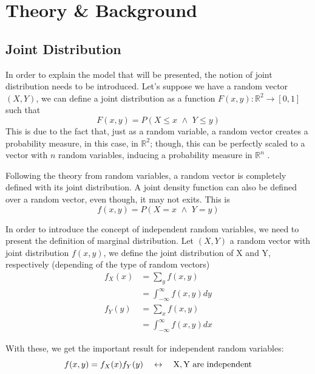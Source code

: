 \section{Theory \& Background}
\label{sec:theory}
	\subsection{Joint Distribution}\label{subsec:joint}
		In order to explain the model that will be presented, the notion of joint distribution needs to be introduced. Let's suppose we have a random vector $(X,Y)$, we can define a joint distribution as a function $F(x,y):\mathbb{R}^2\rightarrow[0,1]$ such that
        \begin{equation}
        	F(x,y)=P(X\leq x\,\,\wedge\,\, Y \leq y)
        \end{equation}
    	This is due to the fact that, just as a random variable, a random vector creates a probability measure, in this case, in $\mathbb{R}^2$; though, this can be perfectly scaled to a vector with $n$ random variables, inducing a probability measure in $\mathbb{R}^n$ \cite{rinconProb}.

        Following the theory from random variables, a random vector is completely defined with its joint distribution. A joint density function can also be defined over a random vector, even though, it may not exits. This is
        \begin{equation}
        	f(x,y)=P(X=x\,\,\wedge\,\,Y=y)
        \end{equation}

         In order to introduce the concept of independent random variables, we need to present the definition of marginal distribution. Let $(X,Y)$ a random vector with joint distribution $f(x,y)$, we define the joint distribution of X and Y, respectively (depending of the type of random vectors)
         \begin{align}
         	f_X(x)&=\sum_{y}f(x,y)\\
            &=\int_{-\infty}^\infty f(x,y)dy\\
            f_Y(y)&=\sum_xf(x,y)\\
            &=\int_{-\infty}^\infty f(x,y)dx
         \end{align}

         With these, we get the important result for independent random variables:
         \begin{equation*}
         	f(x,y)=f_X(x)f_Y(y) \quad \leftrightarrow \quad \text{X,\,Y are independent}
         \end{equation*}

